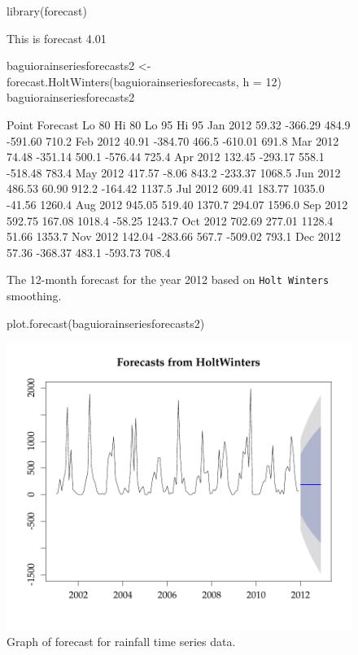 \documentclass{article}\usepackage{graphicx, color}
\begin{document}
\begin{figure}[!ht]
\begin{Schunk}
\begin{Sinput}
library(forecast)
\end{Sinput}
\begin{Soutput}
This is forecast 4.01 
\end{Soutput}
\begin{Sinput}
baguiorainseriesforecasts2 <- forecast.HoltWinters(baguiorainseriesforecasts, 
    h = 12)
baguiorainseriesforecasts2
\end{Sinput}
\begin{Soutput}
         Point Forecast   Lo 80  Hi 80   Lo 95  Hi 95
Jan 2012          59.32 -366.29  484.9 -591.60  710.2
Feb 2012          40.91 -384.70  466.5 -610.01  691.8
Mar 2012          74.48 -351.14  500.1 -576.44  725.4
Apr 2012         132.45 -293.17  558.1 -518.48  783.4
May 2012         417.57   -8.06  843.2 -233.37 1068.5
Jun 2012         486.53   60.90  912.2 -164.42 1137.5
Jul 2012         609.41  183.77 1035.0  -41.56 1260.4
Aug 2012         945.05  519.40 1370.7  294.07 1596.0
Sep 2012         592.75  167.08 1018.4  -58.25 1243.7
Oct 2012         702.69  277.01 1128.4   51.66 1353.7
Nov 2012         142.04 -283.66  567.7 -509.02  793.1
Dec 2012          57.36 -368.37  483.1 -593.73  708.4
\end{Soutput}
\end{Schunk}

\caption{\label{fig:Forecast2} The 12-month forecast for the year 2012 based on \texttt{Holt Winters} smoothing.}
\end{figure}

\begin{figure}[!ht]
\centering
\begin{Schunk}
\begin{Sinput}
plot.forecast(baguiorainseriesforecasts2)
\end{Sinput}

\includegraphics[width=.7\textwidth]{figure/listings-ForecastFigure} \end{Schunk}

\caption{\label{fig:ForecastFigure}Graph of forecast for rainfall time series data.}
\end{figure}
\end{document}
